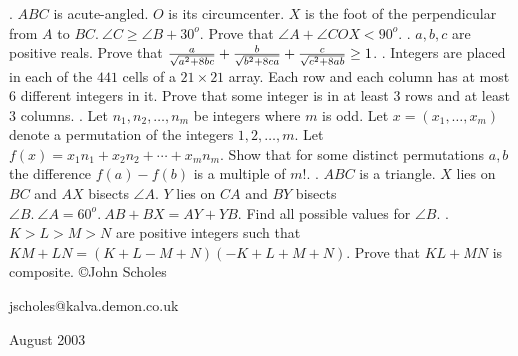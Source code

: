 \nopagenumbers
{}
\vskip 25pt
. $ABC$ is acute-angled. $O$ is its circumcenter. $X$ is the foot of the perpendicular from $A$ to $BC. \ \angle C \ge \angle B + 30^o$. Prove that $\angle A + \angle COX < 90^o$.
\vskip 12pt
. $a, b, c$ are positive reals. Prove that ${a \over \sqrt{a^2 + 8bc}} + {b \over \sqrt{b^2 + 8ca}} + {c\over \sqrt{c^2 + 8ab}} \ge 1$.
\vskip 12pt
. Integers are placed in each of the $441$ cells of a $21 \times 21$ array. Each row and each column has at most $6$ different integers in it. Prove that some integer is in at least 3 rows and at least 3 columns.
\vskip 12pt
. Let $n_1, n_2, \ldots , n_m$ be integers where $m$ is odd. Let $x = (x_1, \ldots , x_m)$ denote a permutation of the integers $1, 2, \ldots , m$. Let $f(x) = x_1 n_1 + x_2 n_2 + \cdots + x_m n_m$. Show that for some distinct permutations $a, b$ the difference $f(a) - f(b)$ is a multiple of $m!$.
\vskip 12pt
. $ABC$ is a triangle. $X$ lies on $BC$ and $AX$ bisects $\angle A$. $Y$ lies on $CA$ and $BY$ bisects $\angle B. \ \angle A = 60^o. \ AB + BX = AY + YB$. Find all possible values for $\angle B$.
\vskip 12pt
. $K > L > M > N$ are positive integers such that $KM + LN = (K + L - M + N)(-K + L + M + N)$. Prove that $KL + MN$ is composite.
\vskip 20pt
\noindent \copyright John Scholes

\noindent jscholes@kalva.demon.co.uk

 August 2003

\bye
